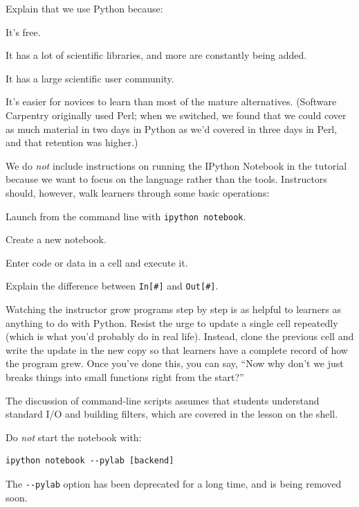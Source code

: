 \documentclass{book}
\begin{document}
\begin{swcitemize}
\item
  Explain that we use Python because:

  \begin{swcitemize2}
  \item
    It's free.
  \item
    It has a lot of scientific libraries, and more are constantly being
    added.
  \item
    It has a large scientific user community.
  \item
    It's easier for novices to learn than most of the mature
    alternatives. (Software Carpentry originally used Perl; when we
    switched, we found that we could cover as much material in two days
    in Python as we'd covered in three days in Perl, and that retention
    was higher.)
   \end{swcitemize2}
\item
  We do \emph{not} include instructions on running the IPython Notebook
  in the tutorial because we want to focus on the language rather than
  the tools. Instructors should, however, walk learners through some
  basic operations:

  \begin{swcitemize2}
  \item
    Launch from the command line with \texttt{ipython notebook}.
  \item
    Create a new notebook.
  \item
    Enter code or data in a cell and execute it.
  \item
    Explain the difference between \texttt{In{[}\#{]}} and
    \texttt{Out{[}\#{]}}.
   \end{swcitemize2}
\item
  Watching the instructor grow programs step by step is as helpful to
  learners as anything to do with Python. Resist the urge to update a
  single cell repeatedly (which is what you'd probably do in real life).
  Instead, clone the previous cell and write the update in the new copy
  so that learners have a complete record of how the program grew. Once
  you've done this, you can say, ``Now why don't we just breaks things
  into small functions right from the start?''
\item
  The discussion of command-line scripts assumes that students
  understand standard I/O and building filters, which are covered in the
  lesson on the shell.
\item
  Do \emph{not} start the notebook with:

\begin{verbatim}
ipython notebook --pylab [backend]
\end{verbatim}

  The \texttt{-{}-pylab} option has been deprecated for a long time, and
  is being removed soon.
\end{swcitemize}
\end{document}
